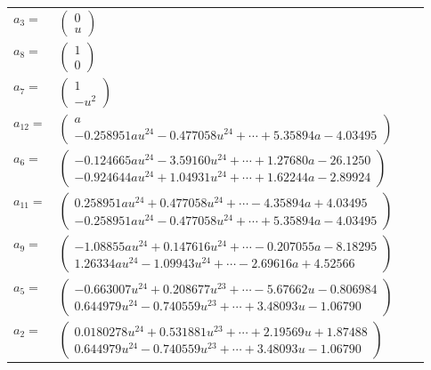 \documentclass[1p]{elsarticle_modified}
\theoremstyle{definition}
\begin{document}
\begin{tabular}{m{7pt} m{180pt} m{7pt} m{180pt} }
\flushright $a_{3}=$&$\begin{pmatrix}0\\u\end{pmatrix}$ \\
\flushright $a_{8}=$&$\begin{pmatrix}1\\0\end{pmatrix}$ \\
\flushright $a_{7}=$&$\begin{pmatrix}1\\- u^2\end{pmatrix}$ \\
\flushright $a_{12}=$&$\begin{pmatrix}a\\-0.258951 a u^{24}-0.477058 u^{24}+\cdots+5.35894 a-4.03495\end{pmatrix}$ \\
\flushright $a_{6}=$&$\begin{pmatrix}-0.124665 a u^{24}-3.59160 u^{24}+\cdots+1.27680 a-26.1250\\-0.924644 a u^{24}+1.04931 u^{24}+\cdots+1.62244 a-2.89924\end{pmatrix}$ \\
\flushright $a_{11}=$&$\begin{pmatrix}0.258951 a u^{24}+0.477058 u^{24}+\cdots-4.35894 a+4.03495\\-0.258951 a u^{24}-0.477058 u^{24}+\cdots+5.35894 a-4.03495\end{pmatrix}$ \\
\flushright $a_{9}=$&$\begin{pmatrix}-1.08855 a u^{24}+0.147616 u^{24}+\cdots-0.207055 a-8.18295\\1.26334 a u^{24}-1.09943 u^{24}+\cdots-2.69616 a+4.52566\end{pmatrix}$ \\
\flushright $a_{5}=$&$\begin{pmatrix}-0.663007 u^{24}+0.208677 u^{23}+\cdots-5.67662 u-0.806984\\0.644979 u^{24}-0.740559 u^{23}+\cdots+3.48093 u-1.06790\end{pmatrix}$ \\
\flushright $a_{2}=$&$\begin{pmatrix}0.0180278 u^{24}+0.531881 u^{23}+\cdots+2.19569 u+1.87488\\0.644979 u^{24}-0.740559 u^{23}+\cdots+3.48093 u-1.06790\end{pmatrix}$ \\

\end{tabular}
\end{document}
